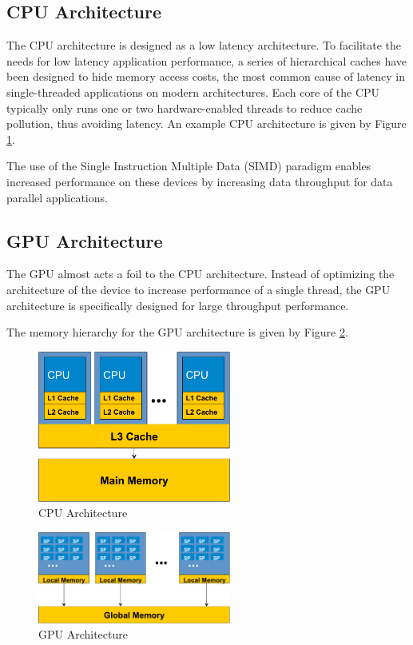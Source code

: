 \documentclass[journal]{IEEEtran}
\begin{document}
\subsection{CPU Architecture}
The CPU architecture is designed as a low latency architecture.  To facilitate
the needs for low latency application performance, a series of hierarchical 
caches have been designed to hide memory access costs, the most common cause
of latency in single-threaded applications on modern architectures.  Each core
of the CPU typically only runs one or two hardware-enabled threads to reduce
cache pollution, thus avoiding latency.  An example CPU architecture is given
by Figure \ref{fig:cpu_arch}.

The use of the Single Instruction Multiple Data (SIMD) paradigm enables increased
performance on these devices by increasing data throughput for data parallel
applications.

\subsection{GPU Architecture}
The GPU almost acts a foil to the CPU architecture.  Instead of optimizing the
architecture of the device to increase performance of a single thread, the GPU
architecture is specifically designed for large throughput performance.  

The memory hierarchy for the GPU architecture is given by Figure \ref{fig:gpu_arch}.

\begin{figure}[!t]
\centering
\includegraphics[width=2.5in]{cpu_architecture}
\caption{CPU Architecture}
\label{fig:cpu_arch}
\end{figure}

\begin{figure}[!t]
\centering
\includegraphics[width=2.5in]{gpu_architecture}
\caption{GPU Architecture}
\label{fig:gpu_arch}
\end{figure}
\end{document}
